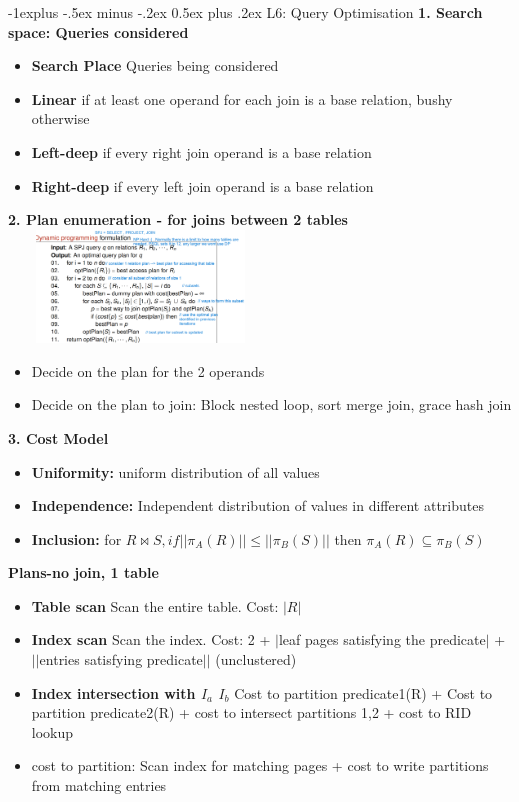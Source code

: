 \documentclass[10pt, landscape]{article}
\makeatletter
\renewcommand{\subsection}{\@startsection{subsection}{2}{0mm}%
                                {-1explus -.5ex minus -.2ex}%
                                {0.5ex plus .2ex}%
                                {\normalfont\normalsize\bfseries}}
\makeatother
\begin{document}
\begin{multicols}{4}
\subsection{L6: Query Optimisation}
\textbf{1. Search space: Queries considered} \\ 
\begin{itemize}
  \item \textbf{Search Place} Queries being considered
  \item \textbf{Linear} if at least one operand for each join is a base relation, bushy otherwise
  \item \textbf{Left-deep} if every right join operand is a base relation 
  \item \textbf{Right-deep} if every left join operand is a base relation
\end{itemize}


\textbf{2. Plan enumeration - for joins between 2 tables} \\
\includegraphics[width=7cm, height =3cm]{dp_2.png}

\begin{itemize}
  \item Decide on the plan for the 2 operands 
  \item Decide on the plan to join: Block nested loop, sort merge join, grace hash join
\end{itemize}

\textbf{3. Cost Model} \\
\begin{itemize}
  \item \textbf{Uniformity:} uniform distribution of all values
  \item \textbf{Independence:} Independent distribution of values in different attributes
  \item \textbf{Inclusion:} for $R\bowtie S, if ||\pi_A(R)|| \leq ||\pi_B(S)||$ then $\pi_A(R) \subseteq \pi_B(S)$
\end{itemize}

\textbf{Plans-no join, 1 table} \\
\begin{itemize}
  \item \textbf{Table scan} Scan the entire table. Cost: $|R|$
  \item \textbf{Index scan} Scan the index. Cost: 2 + $|$leaf pages satisfying the predicate$|$ + $||$entries satisfying predicate$||$ (unclustered)
  \item \textbf{Index intersection with $I_a$ $I_b$} Cost to partition predicate1(R) + Cost to partition predicate2(R) + cost to intersect partitions 1,2 + cost to RID lookup
  \item cost to partition: Scan index for matching pages + cost to write partitions from matching entries
\end{itemize}



\end{multicols}
\end{document}
